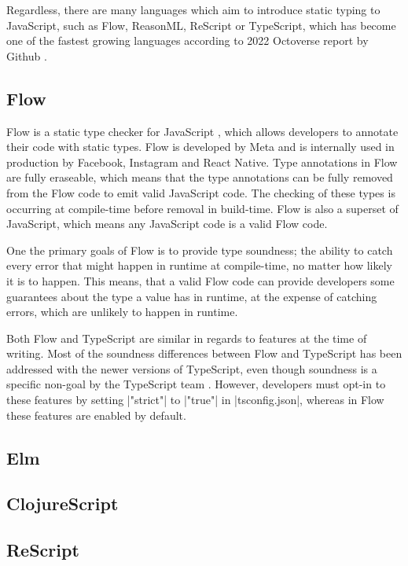 Regardless, there are many languages which aim to introduce static typing to JavaScript, such as Flow, ReasonML, ReScript or TypeScript, which has become one of the fastest growing languages according to 2022 Octoverse report by Github \cite{Octoverse2022State}.

\subsection{Flow}

Flow is a static type checker for JavaScript \cite{Flow2023}, which allows developers to annotate their code with static types. Flow is developed by Meta and is internally used in production by Facebook, Instagram and React Native. Type annotations in Flow are fully eraseable, which means that the type annotations can be fully removed from the Flow code to emit valid JavaScript code. The checking of these types is occurring at compile-time before removal in build-time. Flow is also a superset of JavaScript, which means any JavaScript code is a valid Flow code.

One the primary goals of Flow is to provide type soundness; the ability to catch every error that might happen in runtime at compile-time, no matter how likely it is to happen. This means, that a valid Flow code can provide developers some guarantees about the type a value has in runtime, at the expense of catching errors, which are unlikely to happen in runtime.

Both Flow and TypeScript are similar in regards to features at the time of writing. Most of the soundness differences between Flow and TypeScript has been addressed with the newer versions of TypeScript, even though soundness is a specific non-goal by the TypeScript team \cite{TypeScriptDesignGoals}. However, developers must opt-in to these features by setting \codeword|"strict"| to \codeword|"true"| in \codeword|tsconfig.json|, whereas in Flow these features are enabled by default.

\subsection{Elm}

\subsection{ClojureScript}

\subsection{ReScript}

